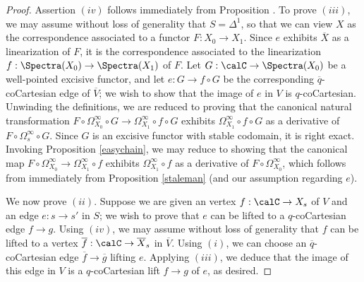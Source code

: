 \begin{proof}
Assertion $(iv)$ follows immediately from Proposition .
To prove $(iii)$, we may assume without loss of generality that $S= \Delta^1$, so that
we can view $X$ as the correspondence associated to a functor $F: X_0 \rightarrow X_1$.
Since $e$ exhibits $\overline{X}$ as a linearization of $F$, it is the correspondence associated
to the linearization $f: \Spectra(X_0) \rightarrow \Spectra(X_1)$ of $F$.
Let $G: \calC \rightarrow \Spectra(X_0)$ be a well-pointed excisive functor, and let
$e: G \rightarrow f \circ G$ be the corresponding $\overline{q}$-coCartesian edge of
$\overline{V}$; we wish to show that the image of $e$ in $V$ is $q$-coCartesian.
Unwinding the definitions, we are reduced to proving that the canonical natural transformation
$F \circ \Omega^{\infty}_{X_0} \circ G \rightarrow \Omega^{\infty}_{X_1} \circ f \circ G$
exhibits $\Omega^{\infty}_{X_1} \circ f \circ G$ as a derivative of
$F \circ \Omega^{\infty}_{s} \circ G$. Since $G$ is an excisive functor with
stable codomain, it is right exact. Invoking Proposition \ref{easychain}, we may
reduce to showing that the canonical map $F \circ \Omega^{\infty}_{X_0} \rightarrow \Omega^{\infty}_{X_1} \circ f$ exhibits $\Omega^{\infty}_{X_1} \circ f$ as a derivative of
$F \circ \Omega^{\infty}_{X_0}$, which follows from immediately from
Proposition \ref{staleman} (and our assumption regarding $e$).

We now prove $(ii)$. Suppose we are given
an vertex $f: \calC \rightarrow X_{s}$ of $V$ and an edge $e: s \rightarrow s'$ in
$S$; we wish to prove that $e$ can be lifted to a $q$-coCartesian edge $f \rightarrow g$.
Using $(iv)$, we may assume without loss of generality that $f$ can be lifted to a vertex $\overline{f}: \calC \rightarrow \overline{X}_s$ in $\overline{V}$. Using $(i)$, we can choose an
$\overline{q}$-coCartesian edge $\overline{f} \rightarrow \overline{g}$ lifting $e$.
Applying $(iii)$, we deduce that the image of this edge in $V$ is a $q$-coCartesian
lift $f \rightarrow g$ of $e$, as desired.
\end{proof}

